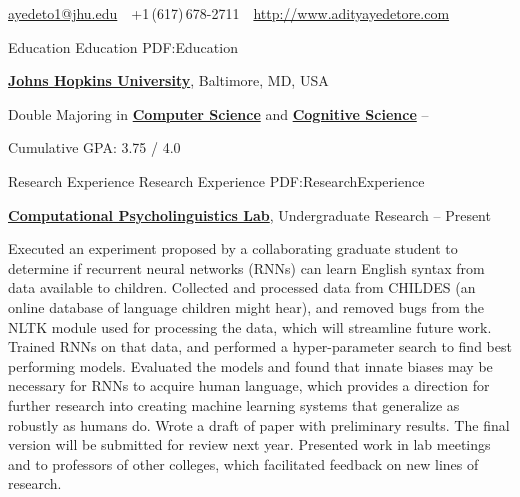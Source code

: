 \documentclass[letterpaper,MMMyyyy,nonstopmode,14pt]{simpleresumecv}
\newcommand{\CVAuthor}{Aditya Yedetore}
\newcommand{\CVWebpage}{http://www.adityayedetore.com}
\begin{document}

\Title{\CVAuthor}

\begin{SubTitle}
\href{mailto:ayedeto1@jhu.edu}
{ayedeto1@jhu.edu}
\,\SubBulletSymbol\,
+1\,(617)\,678-2711
\,\SubBulletSymbol\,
\href{\CVWebpage}
{\url{\CVWebpage}}
\end{SubTitle}

\begin{Body}


\Section
{Education}
{Education}
{PDF:Education}

\Entry
\href{https://www.jhu.edu}
{\textbf{Johns Hopkins University}},
Baltimore, MD, USA

\Gap
\BulletItem
Double Majoring in 
\href{https://www.cs.jhu.edu}
{\textbf{Computer Science}}
and 
\href{https://cogsci.jhu.edu}
{\textbf{Cognitive Science}}
\hfill
{} -- 

\begin{Detail}
	\SubBulletItem
	Cumulative GPA: 3.75 / 4.0
\end{Detail}


\Section
{Research Experience}
{Research Experience}
{PDF:ResearchExperience}

\Entry
\href{https://caplabjhu.org}
{\textbf{Computational Psycholinguistics Lab}},
Undergraduate Research
\hfill
{} --
Present

\BulletItem Executed an experiment proposed by a collaborating graduate student to determine if recurrent neural networks (RNNs) can learn English syntax from data available to children. 
\BulletItem Collected and processed data from CHILDES (an online database of language children might hear), and removed bugs from the NLTK module used for processing the data, which will streamline future work. 
\BulletItem Trained RNNs on that data, and performed a hyper-parameter search to find best performing models. 
\BulletItem Evaluated the models and found that innate biases may be necessary for RNNs to acquire human language, which provides a direction for further research into creating machine learning systems that generalize as robustly as humans do. 
\BulletItem Wrote a draft of paper with preliminary results. The final version will be submitted for review next year. 
\BulletItem Presented work in lab meetings and to professors of other colleges, which facilitated feedback on new lines of research. 


\end{Body}
\end{document}

